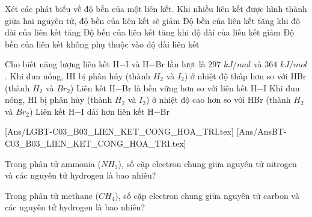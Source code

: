 \begin{ex}Xét các phát biểu về độ bền của một liên kết.
	\choiceTF
	{Khi nhiều liên kết được hình thành giữa hai nguyên tử, độ bền của liên kết sẽ giảm}
	{Độ bền của liên kết tăng khi độ dài của liên kết tăng}
	{\True Độ bền của liên kết tăng khi độ dài của liên kết giảm}
	{Độ bền của liên kết không phụ thuộc vào độ dài liên kết}
\end{ex}
\begin{ex}[CD-SBT]Cho biết năng lượng liên kết H$-$I và H$-$Br lần lượt là $297$ $kJ/mol$ và $364$ $kJ/mol$.
	\choiceTF
	{\True Khi đun nóng, HI bị phân hủy (thành $H_2$ và $I_2$) ở nhiệt độ thấp hơn so với HBr (thành $H_2$ và $Br_2$)}
	{\True Liên kết H$-$Br là bền vững hơn so với liên kết H$-$I}
	{Khi đun nóng, HI bị phân hủy (thành $H_2$ và $I_2$) ở nhiệt độ cao hơn so với HBr (thành $H_2$ và $Br_2$)}
	{\True Liên kết H$-$I dài hơn liên kết H$-$Br}
\end{ex}
[Ans/LGBT-C03_B03_LIEN_KET_CONG_HOA_TRI.tex]
[Ans/AnsBT-C03_B03_LIEN_KET_CONG_HOA_TRI.tex]
\begin{bt} Trong phân tử ammonia ($NH_3$), số cặp electron chung giữa nguyên tử nitrogen và các nguyên tử hydrogen là bao nhiêu?
	\loigiai{}
\end{bt}

\begin{bt}
	Trong phân tử methane ($CH_4$), số cặp electron chung giữa nguyên tử carbon và các nguyên tử hydrogen là bao nhiêu?
	\loigiai{}
\end{bt}

